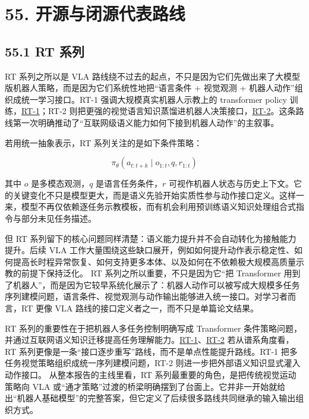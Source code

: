 \chapter*{55. 开源与闭源代表路线}

\section*{55.1 RT 系列}


RT 系列之所以是 VLA 路线绕不过去的起点，不只是因为它们先做出来了大模型版机器人策略，而是因为它们系统性地把“语言条件 + 视觉观测 + 机器人动作”组织成统一学习接口。RT-1 强调大规模真实机器人示教上的 transformer policy 训练，\href{https://robotics-transformer1.github.io/}{RT-1}；RT-2 则把更强的视觉语言知识蒸馏进机器人决策接口，\href{https://robotics-transformer2.github.io/}{RT-2}。这条路线第一次明确推动了“互联网级语义能力如何下接到机器人动作”的主叙事。

若用统一抽象表示，RT 系列关注的是如下条件策略：

\begin{equation*}
\pi_\theta(a_{t:t+k}\mid o_{1:t}, q, r_{1:t})
\end{equation*}

其中 \(o\) 是多模态观测，\(q\) 是语言任务条件，\(r\) 可视作机器人状态与历史上下文。它的关键变化不只是模型更大，而是语义先验开始实质性参与动作接口定义。这样一来，模型不再仅依赖逐任务示教模板，而有机会利用预训练语义知识处理组合式指令与部分未见任务描述。

但 RT 系列留下的核心问题同样清楚：语义能力提升并不会自动转化为接触能力提升。后续 VLA 工作大量围绕这些缺口展开，例如如何提升动作表示稳定性、如何提高长时程异常恢复、如何支持更多本体、以及如何在不依赖极大规模高质量示教的前提下保持泛化。 RT 系列之所以重要，不只是因为它“把 Transformer 用到了机器人”，而是因为它较早系统化展示了：机器人动作可以被写成大规模多任务序列建模问题，语言条件、视觉观测与动作输出能够进入统一接口。对学习者而言，RT 更像 VLA 路线的接口定义者之一，而不只是单篇论文结果。

RT 系列的重要性在于把机器人多任务控制明确写成 Transformer 条件策略问题，并通过互联网语义知识迁移提高任务理解能力。\href{https://arxiv.org/abs/2212.06817}{RT-1}、\href{https://arxiv.org/abs/2307.15818}{RT-2} 若从谱系角度看，RT 系列更像是一条“接口逐步重写”路线，而不是单点性能提升路线。RT-1 把多任务视觉策略组织成统一序列建模问题，RT-2 则进一步把外部语义知识显式灌入动作接口。 从整本报告的主线里看，RT 系列最重要的角色，是把传统视觉运动策略向 VLA 或“通才策略”过渡的桥梁明确摆到了台面上。它并非一开始就给出“机器人基础模型”的完整答案，但它定义了后续很多路线共同继承的输入输出组织方式。

